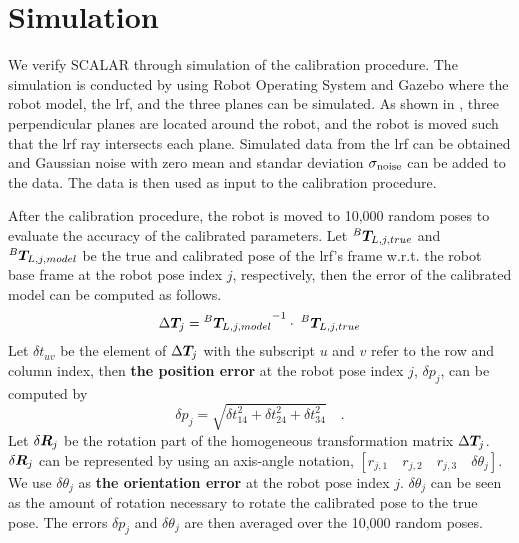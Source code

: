 \section{Simulation}
\label{sec:simulation}

We verify SCALAR through simulation of the calibration procedure. The simulation is conducted by using Robot Operating System and Gazebo where the robot model, the \ac{lrf}, and the three planes can be simulated.  
As shown in , three perpendicular planes are located around the robot, and the robot is moved such that the \ac{lrf} ray intersects each plane. Simulated data from the \ac{lrf} can be obtained and Gaussian noise with zero mean and standar deviation $\sigma_{\rm{noise}}$ can be added to the data. The data is then used as input to the calibration procedure. 

After the calibration procedure, the robot is moved to 10,000 random poses to evaluate the accuracy of the calibrated parameters. Let ${^B}\vb*{T}_{L,j,true}$ and ${^B}\vb*{T}_{L,j,model}$ be the true and calibrated pose of the \ac{lrf}'s frame w.r.t. the robot base frame at the robot pose index $j$, respectively, then the error of the calibrated model can be computed as follows. 
\begin{equation}
\Delta \vb*{T}_j =  {{^B}\vb*{T}_{L,j,model}}^{-1} \cdot\; {^B}\vb*{T}_{L,j,true}
\end{equation}
Let $\delta t_{uv}$ be the element of $\Delta \vb*{T}_j$ with the subscript $u$ and $v$ refer to the row and column index, then \textbf{the position error} at the robot pose index $j$, $\delta p_j$, can be computed by
\begin{equation}
\delta p_j = \sqrt{\delta t_{14}^2 + \delta t_{24}^2 + \delta t_{34}^2} \quad .
\end{equation}
Let $\delta \vb*{R}_j$ be the rotation part of the homogeneous transformation matrix $\Delta \vb*{T}_j$. $\delta \vb*{R}_j$ can be represented by using an axis-angle notation, $[r_{j,1}\quad r_{j,2}\quad r_{j,3}\quad \delta \theta_j]$. We use $\delta\theta_j$ as \textbf{the orientation error} at the robot pose index $j$.  $\delta\theta_j$ can be seen as the amount of rotation necessary to rotate the calibrated pose to the true pose. The errors $\delta p_j$ and $\delta\theta_j$ are then averaged over the 10,000 random poses.



